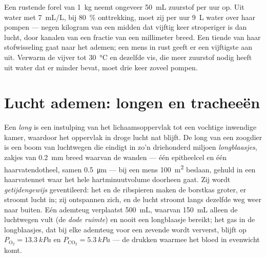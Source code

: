 \begin{example}\label{ex:b1:gas-exchange:priceofwater}
Een rustende forel van \qty{1}{kg} neemt ongeveer \qty{50}{mL} zuurstof per uur op.
Uit water met \qty{7}{mL/L}, bij \qty{80}{\%} onttrekking, moet zij per uur
\qty{9}{L} water over haar  pompen --- negen kilogram van een midden dat
vijftig keer stroperiger is dan lucht, door kanalen van een fractie van een
millimeter breed. Een tiende van haar stofwisseling gaat naar het ademen; een mens
in rust geeft er een vijftigste aan uit. Verwarm de vijver tot \qty{30}{\celsius} en
dezelfde vis, die meer zuurstof nodig heeft uit water dat er minder bevat, moet drie
keer zoveel pompen.
\end{example}

\section{Lucht ademen: longen en tracheeën}

\begin{definition}\label{def:b1:gas-exchange:lung}
Een \emph{long} is een instulping van het lichaamsoppervlak tot een vochtige
inwendige kamer, waardoor het oppervlak in droge lucht nat blijft. De long van een
zoogdier is een boom van luchtwegen die eindigt in zo'n driehonderd miljoen
\emph{longblaasjes}, zakjes van \qty{0.2}{mm} breed waarvan de wanden --- één
epitheelcel en één haarvatendotheel, samen \qty{0.5}{\micro m} --- bij een mens
\qty{100}{m^2} beslaan, gehuld in een haarvatennet waar het hele hartminuutvolume
doorheen gaat. Zij wordt \emph{getijdengewijs} geventileerd: het  en de
ribspieren maken de borstkas groter, er stroomt lucht in; zij ontspannen zich, en
de lucht stroomt langs dezelfde weg weer naar buiten. Eén ademteug verplaatst
\qty{500}{mL}, waarvan \qty{150}{mL} alleen de luchtwegen vult (de \emph{dode
ruimte}) en nooit een longblaasje bereikt; het gas in de longblaasjes, dat bij elke
ademteug voor een zevende wordt ververst, blijft op $P_{\mathrm{O_2}} =
\qty{13.3}{kPa}$ en $P_{\mathrm{CO_2}} = \qty{5.3}{kPa}$ --- de drukken waarmee het
bloed in evenwicht komt.
\end{definition}

